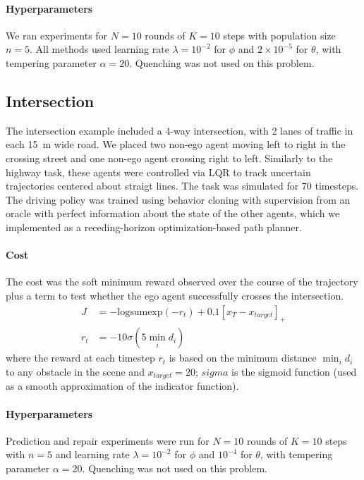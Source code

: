 \paragraph{Hyperparameters} We ran experiments for $N=10$ rounds of $K=10$ steps with population size $n=5$. All methods used learning rate $\lambda = 10^{-2}$ for $\phi$ and $2\times10^{-5}$ for $\theta$, with tempering parameter $\alpha = 20$. Quenching was not used on this problem.

\subsection{Intersection}

The intersection example included a 4-way intersection, with 2 lanes of traffic in each \SI{15}{m} wide road. We placed two non-ego agent moving left to right in the crossing street and one non-ego agent crossing right to left. Similarly to the highway task, these agents were controlled via LQR to track uncertain trajectories centered about straigt lines. The task was simulated for 70 timesteps. The driving policy was trained using behavior cloning with supervision from an oracle with perfect information about the state of the other agents, which we implemented as a receding-horizon optimization-based path planner.

\paragraph{Cost} The cost was the soft minimum reward observed over the course of the trajectory plus a term to test whether the ego agent successfully crosses the intersection.
\begin{align}
    J   & = -\text{logsumexp}(-r_t) + 0.1 [x_T - x_{target}]_+ \\
    r_t & = -10 \sigma(5 \min_i d_i)
\end{align}
where the reward at each timestep $r_t$ is based on the minimum distance $\min_i d_i$ to any obstacle in the scene and $x_{target} = 20$; $sigma$ is the sigmoid function (used as a smooth approximation of the indicator function).

\paragraph{Hyperparameters} Prediction and repair experiments were run for $N=10$ rounds of $K=10$ steps with $n=5$ and learning rate $\lambda = 10^{-2}$ for $\phi$ and $10^{-4}$ for $\theta$, with tempering parameter $\alpha = 20$. Quenching was not used on this problem.
